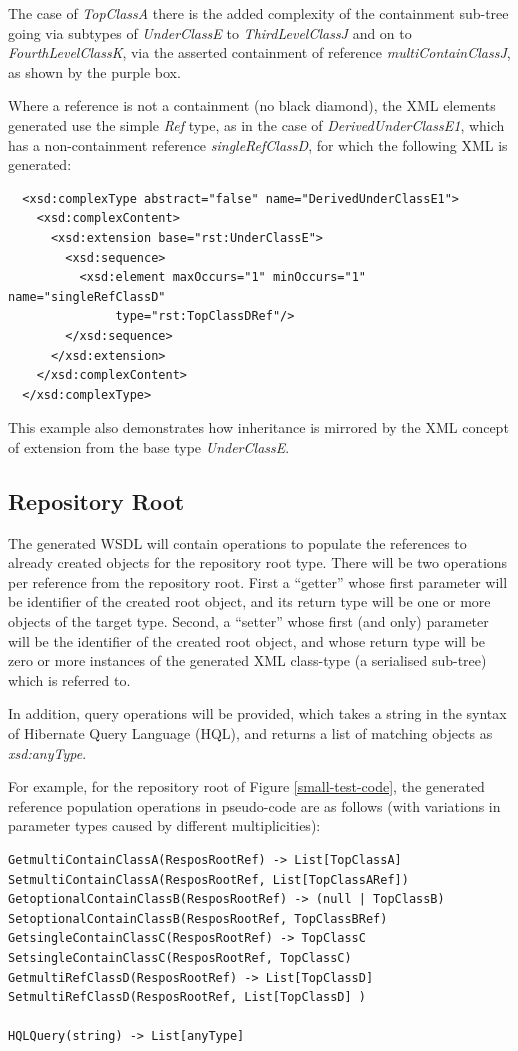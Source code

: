 \documentclass[11pt]{article}
\begin{document}
The case of {\em TopClassA} there is the added complexity of the containment sub-tree going via subtypes of {\em UnderClassE} to {\em ThirdLevelClassJ} and on to {\em FourthLevelClassK}, via the asserted containment of reference {\em multiContainClassJ}, as shown by the purple box.

Where a reference is not a containment (no black diamond), the XML elements generated use the simple {\em Ref} type, as in the case of {\em DerivedUnderClassE1}, which has a non-containment reference {\em singleRefClassD}, for which the following XML is generated:
\begin{verbatim}
  <xsd:complexType abstract="false" name="DerivedUnderClassE1">
    <xsd:complexContent>
      <xsd:extension base="rst:UnderClassE">
        <xsd:sequence>
          <xsd:element maxOccurs="1" minOccurs="1" name="singleRefClassD" 
               type="rst:TopClassDRef"/>
        </xsd:sequence>
      </xsd:extension>
    </xsd:complexContent>
  </xsd:complexType>
\end{verbatim}
This example also demonstrates how inheritance is mirrored by the XML concept of extension from the base type {\em UnderClassE}.

\subsection{Repository Root}
The generated WSDL will contain operations to populate the references to already created objects for the repository root type. There will be two operations per reference from the repository root. First a ``getter'' whose first parameter will be identifier  of the created root object, and its return type will be one or more objects of the target type. Second, a ``setter'' whose  first (and only) parameter will be the identifier  of the created root object, and whose return type will be zero or more instances of the generated XML class-type (a serialised sub-tree) which is referred to.

In addition, query operations will be provided, which takes a string in the syntax of Hibernate Query Language (HQL), and returns a list of matching objects as {\em xsd:anyType}.

For example, for the repository root of Figure \ref{small-test-code}, the generated reference population operations in pseudo-code are as follows (with variations in parameter types caused by different multiplicities):
\begin{verbatim}
GetmultiContainClassA(ResposRootRef) -> List[TopClassA] 
SetmultiContainClassA(ResposRootRef, List[TopClassARef])
GetoptionalContainClassB(ResposRootRef) -> (null | TopClassB)
SetoptionalContainClassB(ResposRootRef, TopClassBRef)
GetsingleContainClassC(ResposRootRef) -> TopClassC
SetsingleContainClassC(ResposRootRef, TopClassC)
GetmultiRefClassD(ResposRootRef) -> List[TopClassD] 
SetmultiRefClassD(ResposRootRef, List[TopClassD] )
 
HQLQuery(string) -> List[anyType]
\end{verbatim}
\end{document}
